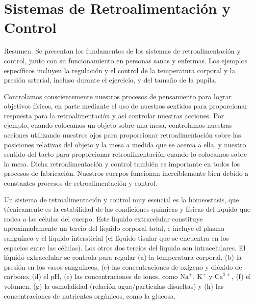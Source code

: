 \documentclass[12pt]{book}
\begin{document}
\chapter{Sistemas de Retroalimentación y Control}
\label{chap:13}


Resumen. Se presentan los fundamentos de los sistemas de retroalimentación y control, junto con su funcionamiento en personas sanas y enfermas. Los ejemplos específicos incluyen la regulación y el control de la temperatura corporal y la presión arterial, incluso durante el ejercicio, y del tamaño de la pupila.

Controlamos conscientemente nuestros procesos de pensamiento para lograr objetivos físicos, en parte mediante el uso de nuestros sentidos para proporcionar respuesta para la retroalimentación y así controlar nuestras acciones. Por ejemplo, cuando colocamos un objeto sobre una mesa, controlamos nuestras acciones utilizando nuestros ojos para proporcionar retroalimentación sobre las posiciones relativas del objeto y la mesa a medida que se acerca a ella, y nuestro sentido del tacto para proporcionar retroalimentación cuando lo colocamos sobre la mesa. Dicha retroalimentación y control también es importante en todos los procesos de fabricación. Nuestros cuerpos funcionan increíblemente bien debido a constantes procesos de retroalimentación y control.

Un sistema de retroalimentación y control muy esencial es la homeostasis, que técnicamente es la estabilidad de las condiciones químicas y físicas del líquido que rodea a las células del cuerpo. Este líquido extracelular constituye aproximadamente un tercio del líquido corporal total, e incluye el plasma sanguíneo y el líquido intersticial (el líquido tisular que se encuentra en los espacios entre las células). Los otros dos tercios del líquido son intracelulares. El líquido extracelular se controla para regular (a) la temperatura corporal, (b) la presión en los vasos sanguíneos, (c) las concentraciones de oxígeno y dióxido de carbono, (d) el pH, (e) las concentraciones de iones, como $\text{Na}^+$, $\text{K}^+$ y $\text{Ca}^{2+}$, (f) el volumen, (g) la osmolalidad (relación agua/partículas disueltas) y (h) las concentraciones de nutrientes orgánicos, como la glucosa.
\end{document}

